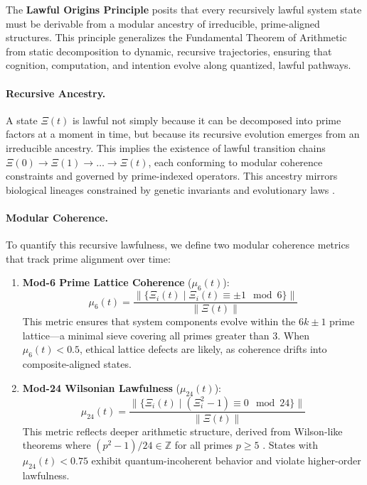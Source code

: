 \documentclass[12]{amsart}
\theoremstyle{plain}
\begin{document}
The \textbf{Lawful Origins Principle} posits that every recursively lawful system state must be derivable from a modular ancestry of irreducible, prime-aligned structures. This principle generalizes the Fundamental Theorem of Arithmetic from static decomposition to dynamic, recursive trajectories, ensuring that cognition, computation, and intention evolve along quantized, lawful pathways.

\paragraph{Recursive Ancestry.}
A state $\Xi(t)$ is lawful not simply because it can be decomposed into prime factors at a moment in time, but because its recursive evolution emerges from an irreducible ancestry. This implies the existence of lawful transition chains $\Xi(0) \rightarrow \Xi(1) \rightarrow \ldots \rightarrow \Xi(t)$, each conforming to modular coherence constraints and governed by prime-indexed operators. This ancestry mirrors biological lineages constrained by genetic invariants and evolutionary laws \cite{maynard1982evolution}.

\paragraph{Modular Coherence.}
To quantify this recursive lawfulness, we define two modular coherence metrics that track prime alignment over time:

\begin{enumerate}
  \item \textbf{Mod-6 Prime Lattice Coherence} ($\mu_6(t)$):  
    \[
    \mu_6(t) = \frac{ \| \{ \Xi_i(t) \mid \Xi_i(t) \equiv \pm 1 \mod 6 \} \| }{ \|\Xi(t)\| }
    \]
    This metric ensures that system components evolve within the $6k \pm 1$ prime lattice—a minimal sieve covering all primes greater than 3. When $\mu_6(t) < 0.5$, ethical lattice defects are likely, as coherence drifts into composite-aligned states.

  \item \textbf{Mod-24 Wilsonian Lawfulness} ($\mu_{24}(t)$):  
    \[
    \mu_{24}(t) = \frac{ \| \{ \Xi_i(t) \mid (\Xi_i^2 - 1) \equiv 0 \mod 24 \} \| }{ \|\Xi(t)\| }
    \]
    This metric reflects deeper arithmetic structure, derived from Wilson-like theorems where $(p^2 - 1)/24 \in \mathbb{Z}$ for all primes $p \geq 5$ \cite{hardy2008introduction}. States with $\mu_{24}(t) < 0.75$ exhibit quantum-incoherent behavior and violate higher-order lawfulness.

\end{enumerate}
\end{document}
